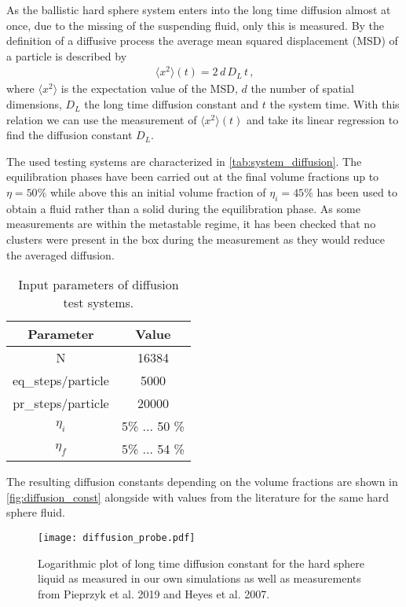 As the ballistic hard sphere system enters into the long time diffusion almost at once, due to the missing of the suspending fluid, only this is measured. By the definition of a diffusive process the average mean squared displacement (MSD) of a particle is described by 
\begin{align}
\label{eqn:diffusion}
\langle x^2 \rangle(t) = 2 \, d \, D_L \, t  \, \text{,}
\end{align}
where $\langle x^2 \rangle$ is the expectation value of the MSD, $d$ the number of spatial dimensions, $D_L$ the long time diffusion constant and $t$ the system time. With this relation we can use the measurement of $\langle x^2 \rangle (t)$ and take its linear regression to find the diffusion constant $D_L$.

The used testing systems are characterized in \autoref{tab:system_diffusion}. The equilibration phases have been carried out at the final volume fractions up to $\eta = 50\%$ while above this an initial volume fraction of $\eta_i = 45\%$ has been used to obtain a fluid rather than a solid during the equilibration phase. As some measurements are within the metastable regime, it has been checked that no clusters were present in the box during the measurement as they would reduce the averaged diffusion.\\


\begin{table}[h]
\centering
\begin{tabular}{c|c}
Parameter & Value \\ \hline
N & 16384 \\
eq\_steps/particle & 5000 \\
pr\_steps/particle & 20000 \\
$\eta_i$ & 5\% ... 50 \% \\
$\eta_f$ & 5\% ... 54 \% \\
\end{tabular}
\caption[Simulation parameters for diffusion measurement]{Input parameters of diffusion test systems.}
\label{tab:system_diffusion}
\end{table}


The resulting diffusion constants depending on the volume fractions are shown in \autoref{fig:diffusion_const} alongside with values from the literature for the same hard sphere fluid.\\

\begin{figure}[h]
\centering
\texttt{[image: diffusion\_probe.pdf]}
\caption[Long time diffusion constant at varying volume fractions]{Logarithmic plot of long time diffusion constant for the hard sphere liquid as measured in our own simulations as well as measurements from Pieprzyk et al. 2019\cite{Pieprzyk2019} and Heyes et al. 2007\cite{Heyes2007}.}
\label{fig:diffusion_const}
\end{figure}

